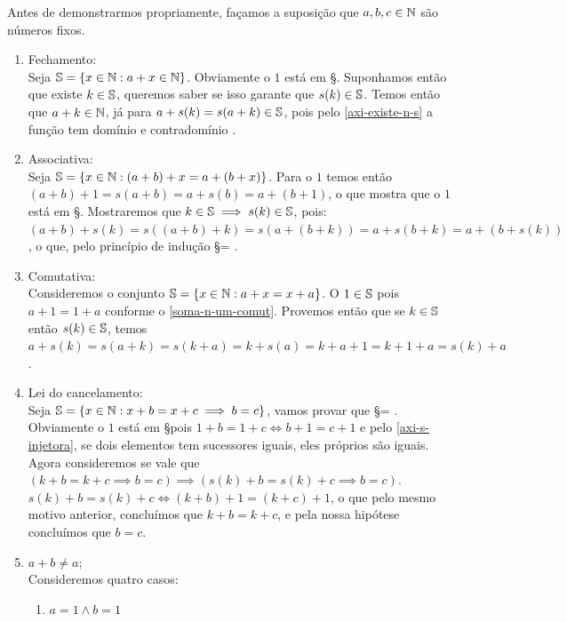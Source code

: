 \documentclass[../main.tex]{subfiles}
\begin{document}
\begin{dem}
    Antes de demonstrarmos propriamente, façamos a suposição que $a,b,c \in \N$ são números fixos.
    \begin{enumerate}[label=(\roman*)]    
        \item Fechamento: \\
            Seja $\S = \{ x \in \N : a + x \in \N \}$. Obviamente o $1$ está em \S. Suponhamos então que existe $k \in \S$, queremos saber se isso garante que $s(k) \in \S$. Temos então que $a + k \in \N$, já para $a + s(k) = s(a + k) \in \S$, pois pelo \cref{axi-existe-n-s} a função tem domínio e contradomínio \N.
        \item Associativa: \\
             Seja $\S = \{ x \in \N : (a + b) + x = a + (b + x) \}$. Para o $1$ temos então
             $(a + b) + 1 = s(a + b) = a + s(b) = a + (b + 1)$, o que mostra que o $1$ está em \S. 
             Mostraremos que $k \in \S \implies s(k) \in \S$, pois:
             $(a + b) + s(k) = s( (a + b) + k) = s(a + (b + k)) = a + s(b + k) = a + (b + s(k))$, o que, pelo princípio de indução \S = \N.
        \item Comutativa: \\
            Consideremos o conjunto $\S = \{ x \in \N : a + x = x + a\}$. O $1 \in \S$ pois 
            $a + 1 = 1 + a$ conforme o \cref{soma-n-um-comut}.
            Provemos então que se $k \in \S$ então $s(k) \in \S$, temos 
            $a + s(k) = s(a + k) = s(k + a) = k + s(a) = k + a + 1 = k + 1 + a = s(k) + a$.
        \item Lei do cancelamento: \\
            Seja $\S = \{ x \in \N : x + b = x + c \implies b = c \}$, vamos provar que \S = \N. Obviamente o $1$ está em \S pois $1 + b = 1 + c \iff b + 1 = c + 1$ e pelo \cref{axi-s-injetora}, se dois elementos tem sucessores iguais, eles próprios são iguais. Agora consideremos se vale que $(k + b = k + c \implies b = c) \implies (s(k) + b = s(k) + c \implies b = c)$. \\
            $s(k) + b = s(k) + c \iff (k + b) + 1 = (k + c) + 1$, o que pelo mesmo motivo anterior, concluímos que $k + b = k + c$, e pela nossa hipótese concluímos que $b = c$.
        \item $a + b \neq a$;\\
            Consideremos quatro casos:
            \begin{enumerate}[label=(\arabic*)]
            \item $a=1 \land b=1$ \\

\end{enumerate}
\end{enumerate}
\end{dem}
\end{document}
